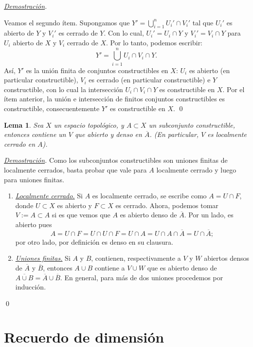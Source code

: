 \documentclass[12pt]{article}
\theoremstyle{customTheorem}
\newtheorem{lemma}[theorem]{Lema}
\theoremstyle{customDefinition}
\renewenvironment{proof}[1][Demostración]{\noindent \textit{\underline{#1}.\hspace{2mm}}}{\hfill\qed}
\renewcommand{\bar}[1]{\overline{#1}}
\begin{document}
\begin{proof}
    \bigskip

    Veamos el segundo ítem. Supongamos que $Y' = \bigcup_{i = 1}^n U_i' \cap V_i'$ tal que $U_i'$ es abierto de $Y$ y $V_i'$ es cerrado de $Y$. Con lo cual, $U_i' = U_i \cap Y$ y $V_i' = V_i \cap Y$ para $U_i$ abierto de $X$ y $V_i$ cerrado de $X$. Por lo tanto, podemos escribir:
    \[
    Y' = \bigcup_{i = 1}^n U_i \cap V_i \cap Y.
    \]
    Así, $Y'$ es la unión finita de conjuntos constructibles en $X$: $U_i$ es abierto (en particular constructible), $V_i$ es cerrado (en particular constructible) e $Y$ constructible, con lo cual la intersección $U_i \cap V_i \cap Y$ es constructible en $X$. Por el ítem anterior, la unión e intersección de finitos conjuntos constructibles es constructible, consecuentemente $Y'$ es constructible en $X$.
\end{proof}

\begin{lemma}\label{Lema}
    Sea $X$ un espacio topológico, y $A \subset X$ un subconjunto constructible, entonces contiene un $V$ que abierto y denso en $\bar A$. (En particular, $V$ es localmente cerrado en $A$).
\end{lemma}
\begin{proof}
    Como los subconjuntos constructibles son uniones finitas de localmente cerrados, basta probar que vale para $A$ localmente cerrado y luego para uniones finitas.
    \begin{enumerate}
        \item \underline{\textit{Localmente cerrado.}} Si $A$ es localmente cerrado, se escribe como $A = U \cap F$, donde $U \subset X$ es abierto y $F \subset X$ es cerrado. Ahora, podemos tomar $V := A \subset A$ si es que vemos que $A$ es abierto denso de $\bar A$. Por un lado, es abierto pues
        \[
        A = U \cap F = U \cap U \cap F = U \cap A = U \cap A \cap \bar A = U \cap \bar A;
        \]
        por otro lado, por definición es denso en su clausura.
        \item \underline{\textit{Uniones finitas.}} Si $A$ y $B$, contienen, respectivamente a $V$ y $W$ abiertos densos de $\bar A$ y $\bar B$, entonces $A\cup B$ contiene a $V \cup W$ que es abierto denso de $\bar {A \cup B} = \bar A \cup \bar B$. En general, para más de dos uniones procedemos por inducción.
    \end{enumerate}
\end{proof}

\section{Recuerdo de dimensión}
\end{document}
